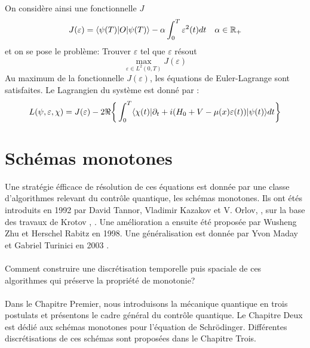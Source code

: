 On considère ainsi une fonctionnelle $J$
\begin{equation}
J(\varepsilon) = \langle \psi(T)|O|\psi(T) \rangle - \alpha \int_{0}^{T}\varepsilon^2(t)dt \quad \alpha \in \mathbb R_+
\end{equation}
et on se pose le problème: Trouver $\varepsilon$ tel que $\varepsilon$ résout
$$ \max_{\varepsilon \in L^2(0,T)} J(\varepsilon)$$
Au maximum de la fonctionnelle $J(\varepsilon)$, les équations de Euler-Lagrange sont satisfaites. Le Lagrangien du système est donné par :
\begin{equation} \label{lagrangien}
L(\psi,\varepsilon,\chi)= J(\varepsilon)\\
-2\Re \bigg\{ \int_{0}^{T}\langle \chi (t)|\partial_{t}+i(H_0+V-\mu(x)\varepsilon(t))|\psi(t) \rangle dt \bigg\}
\end{equation}
\section*{Schémas monotones}
Une stratégie éfficace de résolution de ces équations est donnée par une classe d’algorithmes relevant du contrôle quantique, les schémas monotones. Ils ont étés introduits en 1992 par David Tannor, Vladimir Kazakov et V. Orlov,  \cite{Tannor}, sur la base des travaux de Krotov \cite{Krotov1}, \cite{Krotov2}. Une amélioration a ensuite été proposée par Wusheng Zhu et Herschel Rabitz \cite{Zhu} en 1998. Une généralisation est donnée par Yvon Maday et Gabriel Turinici en 2003 \cite{Maday}.\\\\

Comment construire une discrétisation temporelle puis spaciale de ces algorithmes qui préserve la propriété de monotonie?\\\\

Dans le Chapitre Premier, nous introduisons la mécanique quantique en trois postulats et présentons le cadre général du contrôle quantique. Le Chapitre Deux est dédié aux schémas monotones pour l'équation de Schrödinger.
Différentes discrétisations de ces schémas sont proposées dans le Chapitre Trois.